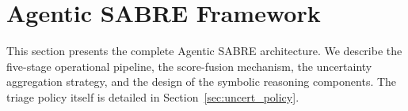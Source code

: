 \documentclass[3p]{elsarticle}
\begin{document}
\begin{table}[t]
\centering
\caption{Comparison of Agentic SABRE with representative prior ransomware and intrusion
detection systems across key design dimensions. \checkmark~= present; $\circ$~= partial;
$\times$~= absent.}
\label{tab:related_comparison}
\end{table}

\section{Agentic SABRE Framework}
\label{sec:method}

This section presents the complete Agentic SABRE architecture. We describe the five-stage
operational pipeline, the score-fusion mechanism, the uncertainty aggregation strategy, and
the design of the symbolic reasoning components. The triage policy itself is detailed in
Section~\ref{sec:uncert_policy}.
\end{document}
